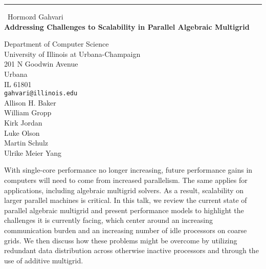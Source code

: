 \documentclass{report}
\begin{document}
\begin{center}
\rule{6in}{1pt} \
{\large Hormozd Gahvari \\
{\bf Addressing Challenges to Scalability in Parallel Algebraic Multigrid}}

Department of Computer Science \\ University of Illinois at Urbana-Champaign \\ 201 N Goodwin Avenue \\ Urbana \\ IL 61801
\\
{\tt gahvari@illinois.edu}\\
Allison H. Baker\\
William Gropp\\
Kirk Jordan\\
Luke Olson\\
Martin Schulz\\
Ulrike Meier Yang\end{center}

With single-core performance no longer increasing, future performance
gains in computers will need to come from increased parallelism. The same
applies for applications, including algebraic multigrid solvers. As a
result, scalability on larger parallel machines is critical. In this
talk, we review the current state of parallel algebraic multigrid and
present performance models to highlight the challenges it is currently
facing, which center around an increasing communication burden and an
increasing number of idle processors on coarse grids. We then discuss how
these problems might be overcome by utilizing redundant data distribution
across otherwise inactive processors and through the use of additive
multigrid.
\end{document}
